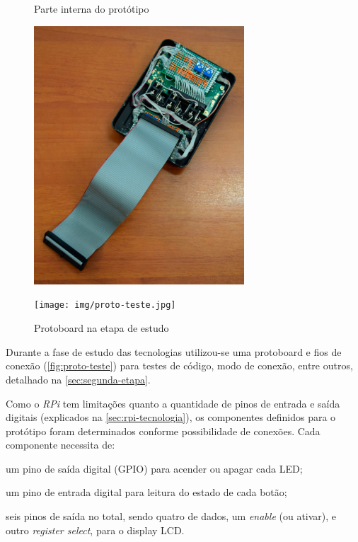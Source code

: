 \begin{figure}[htb]
	\label{teste}
	\centering
 	\begin{minipage}{0.43\textwidth}
		\centering
		\caption{\label{fig:prot-interno}Parte interna do protótipo}
		\includegraphics[width=0.7\textwidth]{img/prot-interno.jpg}
	\end{minipage}
	\hfill
	\begin{minipage}{0.55\textwidth}
		\centering
		\caption{\label{fig:proto-teste}Protoboard na etapa de estudo}
		\texttt{[image: img/proto-teste.jpg]}
	\end{minipage}
\end{figure}

Durante a fase de estudo das tecnologias utilizou-se uma protoboard e fios de conexão (\autoref{fig:proto-teste}) para testes de código, modo de conexão, entre outros, detalhado na \autoref{sec:segunda-etapa}.

Como o \textit{RPi} tem limitações quanto a quantidade de pinos de entrada e saída digitais (explicados na \autoref{sec:rpi-tecnologia}), os componentes definidos para o protótipo foram determinados conforme possibilidade de conexões. Cada componente necessita de:

\begin{alineas}
	\item um pino de saída digital (GPIO) para acender ou apagar cada LED;
	\item um pino de entrada digital para leitura do estado de cada botão;
	\item seis pinos de saída no total, sendo quatro de dados, um \textit{enable} (ou ativar), e outro \textit{register select}, para o display LCD.
\end{alineas}

